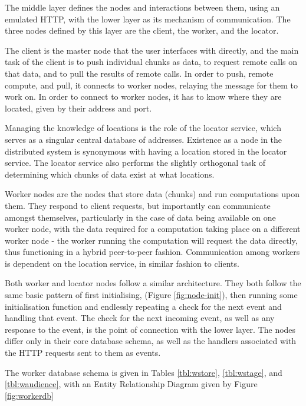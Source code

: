 The middle layer  defines the nodes and interactions between them, using an emulated HTTP, with the lower  layer as its mechanism of communication.
The three nodes defined by this layer are the client, the worker, and the locator.

The client is the master node that the user interfaces with directly, and the main task of the client is to push individual chunks as data, to request remote calls on that data, and to pull the results of remote calls.
In order to push, remote compute, and pull, it connects to worker nodes, relaying the message for them to work on.
In order to connect to worker nodes, it has to know where they are located, given by their address and port.

Managing the knowledge of locations is the role of the locator service, which serves as a singular central database of addresses.
Existence as a node in the distributed system is synonymous with having a location stored in the locator service.
The locator service also performs the slightly orthogonal task of determining which chunks of data exist at what locations.

Worker nodes are the nodes that store data (chunks) and run computations upon them.
They respond to client requests, but importantly can communicate amongst themselves, particularly in the case of data being available on one worker node, with the data required for a computation taking place on a different worker node - the worker running the computation will request the data directly, thus functioning in a hybrid peer-to-peer fashion.
Communication among workers is dependent on the location service, in similar fashion to clients.

Both worker and locator nodes follow a similar architecture.
They both follow the same basic pattern of first initialising, (Figure \cref{fig:node-init}), then running some initialisation function and endlessly repeating a check for the next event and handling that event.
The check for the next incoming event, as well as any response to the event, is the point of connection with the lower \orcv layer.
The nodes differ only in their core database schema, as well as the handlers associated with the HTTP requests sent to them as events.

The worker database schema is given in Tables \cref{tbl:wstore}, \cref{tbl:wstage}, and \cref{tbl:waudience}, with an Entity Relationship Diagram given by Figure \cref{fig:workerdb}


